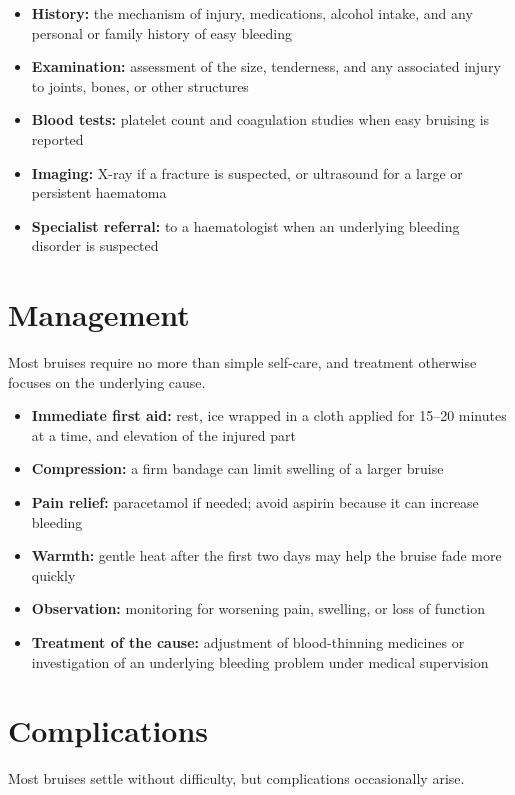 \begin{itemize}
    \item \textbf{History:} the mechanism of injury, medications, alcohol intake, and any personal or family history of easy bleeding
    \item \textbf{Examination:} assessment of the size, tenderness, and any associated injury to joints, bones, or other structures
    \item \textbf{Blood tests:} platelet count and coagulation studies when easy bruising is reported
    \item \textbf{Imaging:} X-ray if a fracture is suspected, or ultrasound for a large or persistent haematoma
    \item \textbf{Specialist referral:} to a haematologist when an underlying bleeding disorder is suspected
\end{itemize}

\section*{Management}
Most bruises require no more than simple self-care, and treatment otherwise focuses on the underlying cause.

\begin{itemize}
    \item \textbf{Immediate first aid:} rest, ice wrapped in a cloth applied for 15--20 minutes at a time, and elevation of the injured part
    \item \textbf{Compression:} a firm bandage can limit swelling of a larger bruise
    \item \textbf{Pain relief:} paracetamol if needed; avoid aspirin because it can increase bleeding
    \item \textbf{Warmth:} gentle heat after the first two days may help the bruise fade more quickly
    \item \textbf{Observation:} monitoring for worsening pain, swelling, or loss of function
    \item \textbf{Treatment of the cause:} adjustment of blood-thinning medicines or investigation of an underlying bleeding problem under medical supervision
\end{itemize}

\section*{Complications}
Most bruises settle without difficulty, but complications occasionally arise.

